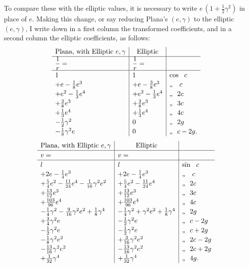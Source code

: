 \documentclass[11pt]{article}
\begin{document}
To compare these with the elliptic values, it is necessary to write
$e\,(1 + \tfrac{1}{2}\gamma^{2})$ in place of $e$. Making this change, or
say reducing Plana's $(e,\gamma)$ to the elliptic $(e,\gamma)$, I write
down in a first column the transformed coefficients, and in a second
column the elliptic coefficients, as follows:
\[
\renewcommand{\arraystretch}{1.15}
\begin{array}{l|l|l}
\multicolumn{1}{c|}{\text{Plana, with Elliptic } e, \gamma}
& \multicolumn{1}{c|}{\text{Elliptic}}
& \\ \hline
\dfrac{1}{r} = & \dfrac{1}{r} = & \\
\hline
1 & 1 & \cos\ \ c \\
+ e - \tfrac{1}{8}e^{3} & + e - \tfrac{3}{8}e^{3} & \text{,,}\ \ \ c \\
+ e^{2} - \tfrac{1}{3}e^{4} & + e^{2} - \tfrac{1}{3}e^{4} & \text{,,}\ \ 2c \\
+ \tfrac{3}{8}e^{3} & + \tfrac{3}{8}e^{3} & \text{,,}\ \ 3c \\
+ \tfrac{1}{3}e^{4} & + \tfrac{1}{3}e^{4} & \text{,,}\ \ 4c \\
- \tfrac{1}{2}\gamma^{2} & 0 & \text{,,}\ \ 2g \\
- \tfrac{1}{8}\gamma^{2}e & 0 & \text{,,}\ \ c - 2g.
\end{array}
\]
\[
\renewcommand{\arraystretch}{1.15}
\begin{array}{l|l|l}
\multicolumn{1}{c|}{\text{Plana, with Elliptic } e, \gamma}
& \multicolumn{1}{c|}{\text{Elliptic}}
& \\ \hline
v = & v = & \\
\hline
l & l & \sin\ \ c \\
+ 2e - \tfrac{1}{4}e^{3} & + 2e - \tfrac{1}{4}e^{3} & \text{,,}\ \ \ c \\
+ \tfrac{5}{4}e^{2} - \tfrac{11}{24}e^{4} - \tfrac{1}{16}\gamma^{2}e^{2}
   & + \tfrac{5}{4}e^{2} - \tfrac{11}{24}e^{4} & \text{,,}\ \ 2c \\
+ \tfrac{13}{12}e^{3} & + \tfrac{13}{12}e^{3} & \text{,,}\ \ 3c \\
+ \tfrac{103}{96}e^{4} & + \tfrac{103}{96}e^{4} & \text{,,}\ \ 4c \\
- \tfrac{1}{4}\gamma^{2} - \tfrac{9}{16}\gamma^{2}e^{2} + \tfrac{1}{8}\gamma^{4}
   & - \tfrac{1}{4}\gamma^{2} + \gamma^{2}e^{2} + \tfrac{1}{8}\gamma^{4} & \text{,,}\ \ 2g \\
+ \tfrac{3}{4}\gamma^{2}e & - \tfrac{1}{2}\gamma^{2}e & \text{,,}\ \ c - 2g \\
- \tfrac{1}{2}\gamma^{2}e & - \tfrac{1}{2}\gamma^{2}e & \text{,,}\ \ c + 2g \\
- \tfrac{1}{8}\gamma^{2}e^{2} & + \tfrac{3}{16}\gamma^{2}e^{2} & \text{,,}\ \ 2c - 2g \\
- \tfrac{13}{16}\gamma^{2}e^{2} & - \tfrac{13}{16}\gamma^{2}e^{2} & \text{,,}\ \ 2c + 2g \\
+ \tfrac{1}{32}\gamma^{4} & + \tfrac{1}{32}\gamma^{4} & \text{,,}\ \ 4g.
\end{array}
\]
\end{document}
